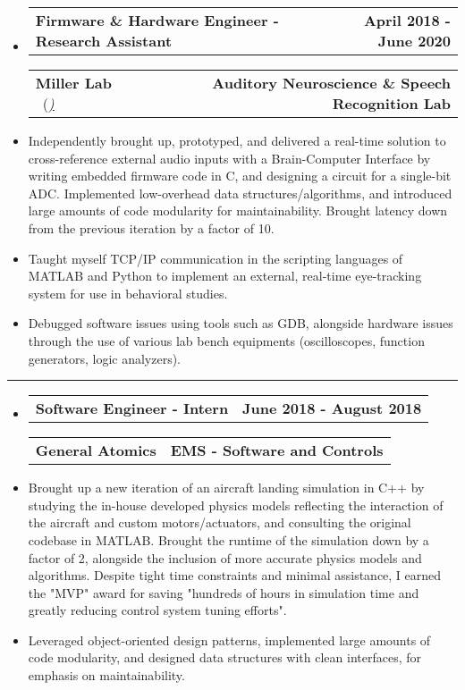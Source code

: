 \documentclass[10pt,letterpaper]{article}
\makeatletter
\newcommand{\header}[2]
{
	\begin{tabular*}{\linewidth}{l @{\extracolsep{\fill}} r}
		\hspace{-27pt} #1 & #2 \\
	\end{tabular*}
}
\makeatother
\begin{document}
\begin{itemize}
	\item[]
		\header
		{\textbf{Firmware \& Hardware Engineer - Research Assistant}} 
		{\textbf{April 2018 - June 2020}}
		\header
		{\textbf{Miller Lab} \ (\href{https://millerlab.faculty.ucdavis.edu}{\small \emph{\underline{\smash{millerlab.faculty.ucdavis.edu})}}} }
		{\textbf{Auditory Neuroscience \& Speech Recognition Lab}} 
	\item
		Independently brought up, prototyped, and delivered a real-time solution to cross-reference external audio inputs with a Brain-Computer Interface by writing embedded firmware code in C, and designing a circuit for a single-bit ADC. Implemented low-overhead data structures/algorithms, and introduced large amounts of code modularity for maintainability. Brought latency down from the previous iteration by a factor of 10. 
	\item 
		Taught myself TCP/IP communication in the scripting languages of MATLAB and Python to implement an external, real-time eye-tracking system for use in behavioral studies.
	\item 
		Debugged software issues using tools such as GDB, alongside hardware issues through the use of various lab bench equipments (oscilloscopes, function generators, logic analyzers).
\end{itemize}

\hrule

\begin{itemize}
	\item[]
		\header
		{\textbf{Software Engineer - Intern}} 
		{\textbf{June 2018 - August 2018}}
		\header
		{\textbf{General Atomics}}
		{\textbf{EMS - Software and Controls}} 
	\item
		Brought up a new iteration of an aircraft landing simulation in C++ by studying the in-house developed physics models reflecting the interaction of the aircraft and custom motors/actuators, and consulting the original codebase in MATLAB. Brought the runtime of the simulation down by a factor of 2, alongside the inclusion of more accurate physics models and algorithms. Despite tight time constraints and minimal assistance, I earned the "MVP" award for saving "hundreds of hours in simulation time and greatly reducing control system tuning efforts". 

	\item
		Leveraged object-oriented design patterns, implemented large amounts of code modularity, and designed data structures with clean interfaces, for emphasis on maintainability.


\end{itemize}
\end{document}

